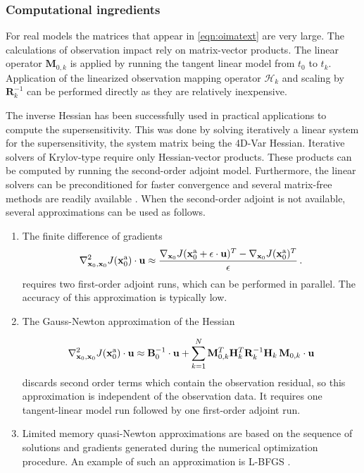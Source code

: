 \documentclass[final,sort&compress]{elsarticle}
\newcommand{\Jfunc}{\mathcal J }
\newcommand{\M}{\mathbf{M}}
\newcommand{\HH}{\mathbf H}
\newcommand{\B}{\mathbf{B}}
\newcommand{\R}{\mathbf{R}}
\newcommand{\x}{   \mathbf{x} }
\newcommand{\xa}{ \mathbf{x}^{\rm a} }
\renewcommand{\u}{ \mathbf{u} }
\renewcommand{\H}{\mathcal{H}}
\begin{document}
\subsubsection{Computational ingredients}

For real models the matrices that appear in \eqref{eqn:oimatext} are very large. 
The calculations of observation impact rely on matrix-vector products. 
The linear operator $\M_{0,k}$ is applied by running the tangent linear model from $t_0$ to $t_k$. 
Application of the linearized observation mapping operator $\H_k$ and scaling by 
$\R_k^{-1}$ can be performed directly as they are relatively inexpensive.

The inverse Hessian has been successfully used in practical applications to compute the supersensitivity.
This was done by solving iteratively a linear system for the supersensitivity, the system matrix being the 4D-Var Hessian.
Iterative solvers of Krylov-type require only Hessian-vector products. 
These products can be computed by running the second-order adjoint model.
Furthermore, the linear solvers can be preconditioned for faster convergence and several matrix-free methods are readily available \cite{Cioaca_2012}.
When the second-order adjoint is not available, several approximations can be used as follows.

\begin{enumerate}

\item The finite difference of gradients
\[
\nabla_{\x_0,\x_0}^2 \mathcal \Jfunc(\xa_0) \cdot \u \approx \frac{\nabla_{\x_0} \mathcal \Jfunc(\xa_0 + \epsilon \cdot \u)^T - \nabla_{\x_0} \mathcal \Jfunc(\xa_0)^T}{\epsilon}\,.
\]
requires two first-order adjoint runs, which can be performed in parallel. The accuracy of this approximation is typically low.
 
\item The Gauss-Newton approximation of the Hessian
 
\[
\nabla_{\x_0,\x_0}^2 \mathcal \Jfunc(\xa_0) \cdot \u \approx \B_0^{-1}  \cdot \u + \sum_{k=1}^{N}  \M_{0,k}^T \HH_k^T \R_k^{-1}  \HH_k\, \M_{0,k}\cdot \u
\]
discards second order terms which contain the observation residual, so this approximation is independent of the observation data. It requires one tangent-linear model run 
followed by one first-order adjoint run.
 
\item Limited memory quasi-Newton approximations are based on the sequence of solutions and gradients generated during the numerical optimization procedure.
An example of such an approximation is L-BFGS \cite{zhu1997algorithm}.
  
\end{enumerate}
\end{document}

